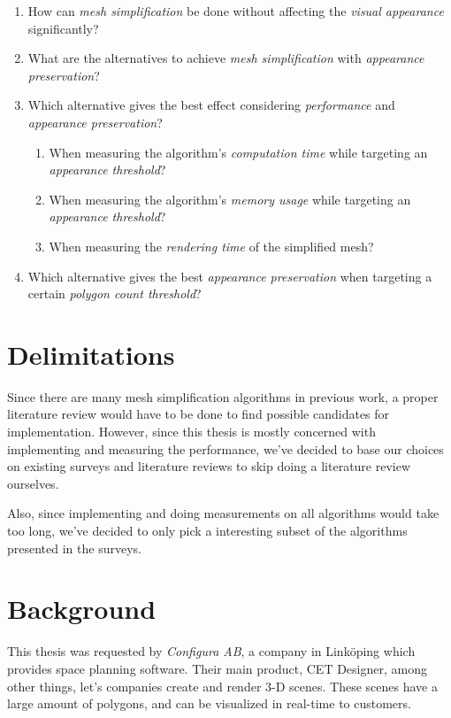 \begin{enumerate}
\item How can \emph{mesh simplification} be done without affecting the \emph{visual appearance} significantly?

\item What are the alternatives to achieve \emph{mesh simplification} with \emph{appearance preservation}?

\item{Which alternative gives the best effect considering \emph{performance} and  \emph{appearance preservation}?
  \begin{enumerate}
  \item When measuring the algorithm's \emph{computation time} while targeting an \emph{appearance threshold}?
  \item When measuring the algorithm's \emph{memory usage} while targeting an \emph{appearance threshold}?
  \item When measuring the \emph{rendering time} of the simplified mesh? 
  \end{enumerate}
}
\item Which alternative gives the best \emph{appearance preservation} when targeting a certain \emph{polygon count threshold}?
\end{enumerate}


\section{Delimitations}
\label{sec:delimitations}

Since there are many mesh simplification algorithms in previous work, a proper literature review would have to be done to find possible candidates for implementation. However, since this thesis is mostly concerned with implementing and measuring the performance, we've decided to base our choices on existing surveys and literature reviews to skip doing a literature review ourselves.

Also, since implementing and doing measurements on all algorithms would take too long, we've decided to only pick a interesting subset of the algorithms presented in the surveys.

\section{Background}
\label{sec:background}

This thesis was requested by \emph{Configura AB}, a company in Linköping which provides space planning software. Their main product, CET Designer, among other things, let's companies create and render 3-D scenes. These scenes have a large amount of polygons, and can be visualized in real-time to customers.

